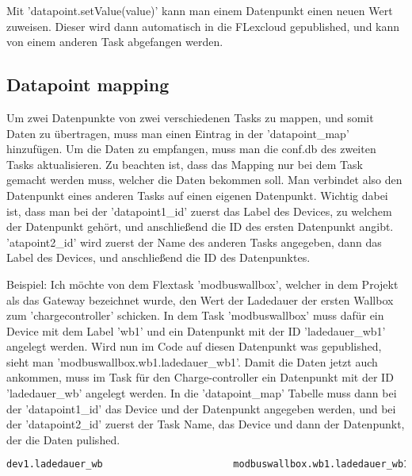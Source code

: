 Mit 'datapoint.setValue(value)' kann man einem Datenpunkt einen neuen Wert zuweisen. Dieser wird dann automatisch in die FLexcloud gepublished, und kann von einem anderen Task abgefangen werden.


\subsection{Datapoint mapping} 

Um zwei Datenpunkte von zwei verschiedenen Tasks zu mappen, und somit Daten zu übertragen, muss man einen Eintrag in der 'datapoint\_map' hinzufügen. Um die Daten zu empfangen, muss man die conf.db des zweiten Tasks aktualisieren. Zu beachten ist, dass das Mapping nur bei dem Task gemacht werden muss, welcher die Daten bekommen soll. Man verbindet also den Datenpunkt eines anderen Tasks auf einen eigenen Datenpunkt. Wichtig dabei ist, dass man bei der 'datapoint1\_id' zuerst das Label des Devices, zu welchem der Datenpunkt gehört, und anschließend die ID des ersten Datenpunkt angibt. 'atapoint2\_id' wird zuerst der Name des anderen Tasks angegeben, dann das Label des Devices, und anschließend die ID des Datenpunktes.



Beispiel: Ich möchte von dem Flextask 'modbuswallbox', welcher in dem Projekt als das Gateway bezeichnet wurde, den Wert der Ladedauer der ersten Wallbox zum 'chargecontroller' schicken. In dem Task 'modbuswallbox' muss dafür ein Device mit dem Label 'wb1' und ein Datenpunkt mit der ID 'ladedauer\_wb1' angelegt werden. Wird nun im Code auf diesen Datenpunkt was gepublished, sieht man 'modbuswallbox.wb1.ladedauer\_wb1'. Damit die Daten jetzt auch ankommen, muss im Task für den Charge-controller ein Datenpunkt mit der ID 'ladedauer\_wb' angelegt werden. In die 'datapoint\_map' Tabelle muss dann bei der 'datapoint1\_id' das Device und der Datenpunkt angegeben werden, und bei der 'datapoint2\_id' zuerst der Task Name, das Device und dann der Datenpunkt, der die Daten pulished.

\begin{lstlisting}[language=sql,caption=Eintrag in die datapoint\_map Tabelle,label=lst:impl:foo]
    dev1.ladedauer_wb                       modbuswallbox.wb1.ladedauer_wb1
\end{lstlisting}